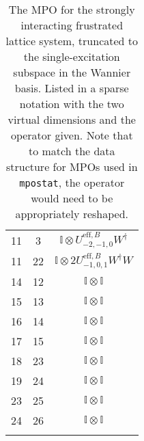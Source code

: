 \begin{longtable}{ccc}
	11 & 3  & \(\mathbb{I} \otimes U^{\mathrm{eff},B}_{-2,-1,0}W^{\dagger}\) \\
	11 & 22 & \(\mathbb{I} \otimes 2U^{\mathrm{eff},B}_{-1,0,1}W^{\dagger}W\) \\
	14 & 12 & \(\mathbb{I} \otimes \mathbb{I}\) \\
	15 & 13 & \(\mathbb{I} \otimes \mathbb{I}\) \\
	16 & 14 & \(\mathbb{I} \otimes \mathbb{I}\) \\
	17 & 15 & \(\mathbb{I} \otimes \mathbb{I}\) \\
	18 & 23 & \(\mathbb{I} \otimes \mathbb{I}\) \\
	19 & 24 & \(\mathbb{I} \otimes \mathbb{I}\) \\
	23 & 25 & \(\mathbb{I} \otimes \mathbb{I}\) \\
	24 & 26 & \(\mathbb{I} \otimes \mathbb{I}\) \\
	\hline
	\caption{\label{tab:dim3-2}The MPO for the strongly interacting frustrated lattice system, truncated to the single-excitation subspace in the Wannier basis. Listed in a sparse notation with the two virtual dimensions and the operator given. Note that to match the data structure for MPOs used in \lstinline$mpostat$, the operator would need to be appropriately reshaped. } 	
\end{longtable}

